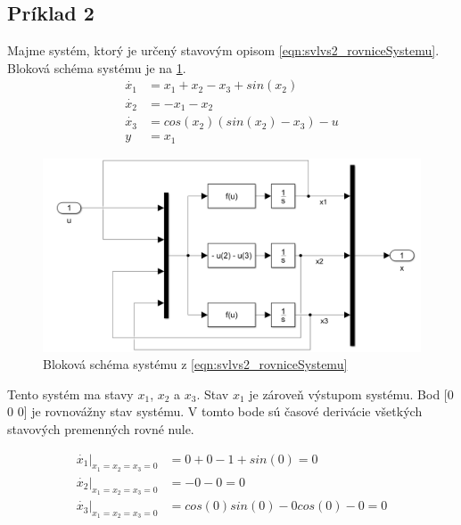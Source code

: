\documentclass[../main.tex]{subfiles}
\begin{document}
	\subsection*{Príklad 2}
	Majme systém, ktorý je určený stavovým opisom \cref{eqn:svlvs2_rovniceSystemu}. Bloková schéma systému je na \cref{fig:svlvs2_obrazokModelSystemu}.
	\begin{equation}
		\begin{aligned}
		\dot{x_1} &= x_1 + x_2 - x_3 + sin(x_2) 			\\
		\dot{x_2} &= - x_1 - x_2 						\\
		\dot{x_3} &= cos(x_2) (sin(x_2) - x_3) - u 	\\
		y &= x_1
		\end{aligned}
		\label{eqn:svlvs2_rovniceSystemu}
	\end{equation}

	\begin{figure}[h!]
		\centering
		\includegraphics[width=0.8\linewidth]{ModelSystemu}
		\caption{Bloková schéma systému z \cref{eqn:svlvs2_rovniceSystemu}}
		\label{fig:svlvs2_obrazokModelSystemu}
	\end{figure}

Tento systém ma stavy $x_1$, $x_2$ a $x_3$. Stav $x_1$ je zároveň výstupom systému.
Bod [0 0 0] je rovnovážny stav systému. V tomto bode sú časové derivácie všetkých stavových premenných rovné nule.

	\begin{equation}
		\begin{aligned}
		\dot{x_1}|_{x_1 = x_2 = x_3 = 0} &= 0 + 0 - 1 + sin(0) = 0 					\\
		\dot{x_2}|_{x_1 = x_2 = x_3 = 0} &= -0 - 0 = 0 							\\
		\dot{x_3}|_{x_1 = x_2 = x_3 = 0} &= cos(0)sin(0) - 0cos(0) - 0 = 0 			\\
		\end{aligned}
		\label{eqn:svlvs2_rovniceRovnovaznyStav}
	\end{equation}
\end{document}
